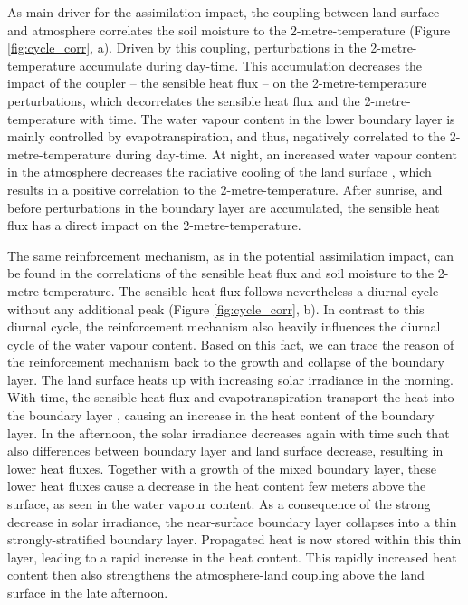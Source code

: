 \documentclass[hess, manuscript]{copernicus}
\begin{document}
As main driver for the assimilation impact, the coupling between land surface and atmosphere correlates the soil moisture to the 2-metre-temperature (Figure \ref{fig:cycle_corr}, a).
Driven by this coupling, perturbations in the 2-metre-temperature accumulate during day-time.
This accumulation decreases the impact of the coupler – the sensible heat flux – on the 2-metre-temperature perturbations, which decorrelates the sensible heat flux and the 2-metre-temperature with time.
The water vapour content in the lower boundary layer is mainly controlled by evapotranspiration, and thus, negatively correlated to the 2-metre-temperature during day-time.
At night, an increased water vapour content in the atmosphere decreases the radiative cooling of the land surface \citep{harrison_effect_1981}, which results in a positive correlation to the 2-metre-temperature.
After sunrise, and before perturbations in the boundary layer are accumulated, the sensible heat flux has a direct impact on the 2-metre-temperature.

The same reinforcement mechanism, as in the potential assimilation impact,
can be found in the correlations of the sensible heat flux and soil moisture to the 2-metre-temperature.
The sensible heat flux follows nevertheless a diurnal cycle without any additional peak (Figure \ref{fig:cycle_corr}, b).
In contrast to this diurnal cycle, the reinforcement mechanism also heavily influences the diurnal cycle of the water vapour content.
Based on this fact, we can trace the reason of the reinforcement mechanism back to the growth and collapse of the boundary layer.
The land surface heats up with increasing solar irradiance in the morning.
With time, the sensible heat flux and evapotranspiration transport the heat into the boundary layer \citep{stull_introduction_1988}, causing an increase in the heat content of the boundary layer.
In the afternoon, the solar irradiance decreases again with time such that also differences between boundary layer and land surface decrease, resulting in lower heat fluxes.
Together with a growth of the mixed boundary layer, these lower heat fluxes cause a decrease in the heat content few meters above the surface, as seen in the water vapour content.
As a consequence of the strong decrease in solar irradiance, the near-surface boundary layer collapses into a thin strongly-stratified boundary layer.
Propagated heat is now stored within this thin layer, leading to a rapid increase in the heat content.
This rapidly increased heat content then also strengthens the atmosphere-land coupling above the land surface in the late afternoon.\\
\end{document}
